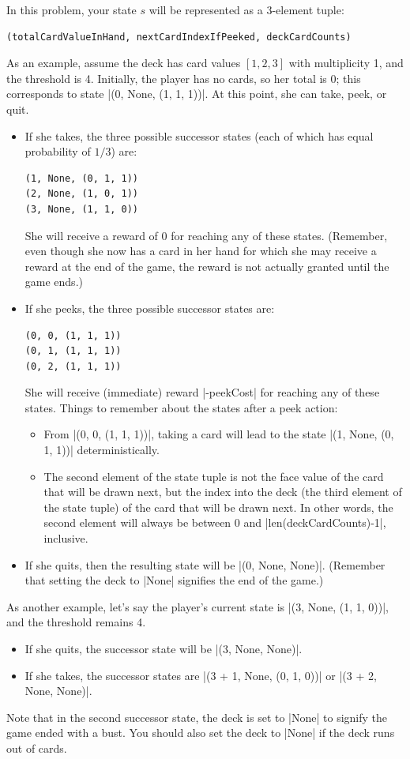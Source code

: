 In this problem, your state $s$ will be represented as a 3-element tuple:
\begin{lstlisting}  
(totalCardValueInHand, nextCardIndexIfPeeked, deckCardCounts)
\end{lstlisting}

As an example, assume the deck has card values $[1, 2, 3]$ with multiplicity 1,
and the threshold is 4. Initially, the player has no cards, so her total is 0;
this corresponds to state |(0, None, (1, 1, 1))|. At this point, she can take,
peek, or quit.
\begin{itemize}
  \item If she takes, the three possible successor states (each of which has
  equal probability of $1/3$) are:
\begin{lstlisting}
(1, None, (0, 1, 1))
(2, None, (1, 0, 1))
(3, None, (1, 1, 0))
\end{lstlisting}
  She will receive a reward of 0 for reaching any of these states.  (Remember,
  even though she now has a card in her hand for which she may receive a reward
  at the end of the game, the reward is not actually granted until the game
  ends.)
  \item If she peeks, the three possible successor states are:
\begin{lstlisting}
(0, 0, (1, 1, 1))
(0, 1, (1, 1, 1))
(0, 2, (1, 1, 1))
\end{lstlisting}
  She will receive (immediate) reward |-peekCost| for reaching any of these
  states. Things to remember about the states after a peek action:
  \begin{itemize}
    \item From |(0, 0, (1, 1, 1))|, taking a card will lead to the state |(1, None, (0, 1, 1))| deterministically.
    \item The second element of the state tuple is not the face value of the
    card that will be drawn next, but the index into the deck (the third element
    of the state tuple) of the card that will be drawn next.  In other words,
    the second element will always be between 0 and |len(deckCardCounts)-1|,
    inclusive.
  \end{itemize}
  \item If she quits, then the resulting state will be |(0, None, None)|.
  (Remember that setting the deck to |None| signifies the end of the game.)
\end{itemize}

As another example, let's say the player's current state is |(3, None, (1, 1, 0))|, and the threshold remains 4.
\begin{itemize}
  \item If she quits, the successor state will be |(3, None, None)|.
  \item If she takes, the successor states are |(3 + 1, None, (0, 1, 0))| or |(3 + 2, None, None)|.
\end{itemize}

Note that in the second successor state, the deck is set to |None| to signify
the game ended with a bust. You should also set the deck to |None| if the deck
runs out of cards.

\begin{enumerate}

  

\end{enumerate}
